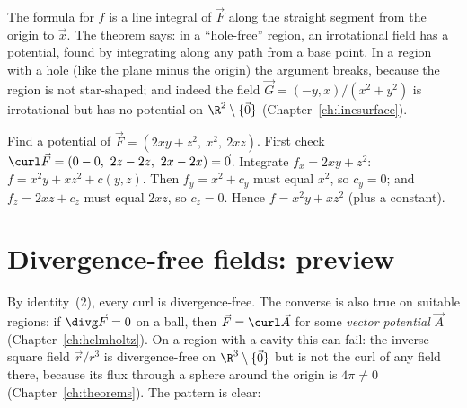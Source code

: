 \begin{intuition}
The formula for $f$ is a line integral of $\vec F$ along the straight segment from the origin to $\vec x$. The theorem says: in a ``hole-free'' region, an irrotational field has a potential, found by integrating along any path from a base point. In a region with a hole (like the plane minus the origin) the argument breaks, because the region is not star-shaped; and indeed the field $\vec G=(-y,x)/(x^2+y^2)$ is irrotational but has no potential on $\R^2\setminus\{\vec 0\}$ (Chapter~\ref{ch:linesurface}).
\end{intuition}

\begin{example}
Find a potential of $\vec F=(2xy+z^2,\ x^2,\ 2xz)$. First check $\curl\vec F=(0-0,\ 2z-2z,\ 2x-2x)=\vec 0$. Integrate $f_x=2xy+z^2$: $f=x^2y+xz^2+c(y,z)$. Then $f_y=x^2+c_y$ must equal $x^2$, so $c_y=0$; and $f_z=2xz+c_z$ must equal $2xz$, so $c_z=0$. Hence $f=x^2y+xz^2$ (plus a constant).
\end{example}

\section{Divergence-free fields: preview}

By identity~(2), every curl is divergence-free. The converse is also true on suitable regions: if $\divg\vec F=0$ on a ball, then $\vec F=\curl\vec A$ for some \emph{vector potential} $\vec A$ (Chapter~\ref{ch:helmholtz}). On a region with a cavity this can fail: the inverse-square field $\vec r/r^3$ is divergence-free on $\R^3\setminus\{\vec 0\}$ but is not the curl of any field there, because its flux through a sphere around the origin is $4\pi\ne0$ (Chapter~\ref{ch:theorems}). The pattern is clear:

\begin{center}
\end{center}

